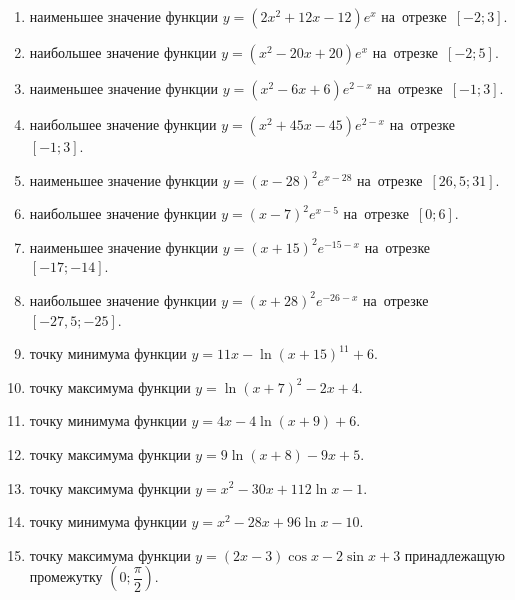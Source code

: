 \documentclass[a4paper,10pt]{article}
\begin{document}
\begin{enumerate}
\item {} наименьшее значение функции $y=\left(2x^2 +12x -12\right)e^{x }$ на~отрезке~$\left[-2;3\right]$.

\item {} наибольшее значение функции $y=\left(x^2 -20x +20\right)e^{x}$ на~отрезке~$\left[-2;5\right]$.

\item {} наименьшее значение функции $y=\left(x^2 -6x +6\right)e^{2-x}$ на~отрезке~$\left[-1;3\right]$.

\item {} наибольшее значение функции $y=\left(x^2 +45x -45\right)e^{2-x}$ на~отрезке~$\left[-1;3\right]$.

\item {} наименьшее значение функции $y=\left(x-28\right)^2e^{x-28}$ на~отрезке~$\left[26,5;31\right]$.

\item {} наибольшее значение функции $y=\left(x-7\right)^2e^{x-5}$ на~отрезке~$\left[0;6\right]$.

\item {} наименьшее значение функции $y=\left(x+15\right)^2e^{-15-x}$ на~отрезке~$\left[-17;-14\right]$.

\item {} наибольшее значение функции $y=\left(x+28\right)^2e^{-26-x}$ на~отрезке~$\left[-27,5;-25\right]$.

\item {} точку минимума функции $y=11x-\ln\left(x+15\right)^{11}+6$.

\item {} точку максимума функции $y=\ln\left(x+7\right)^{2}-2x+4$.

\item {} точку минимума функции $y=4x-4\ln\left(x+9\right)+6$.

\item {} точку максимума функции $y=9\ln\left(x+8\right)-9x+5$.

\item {} точку максимума функции $y=x^2-30x+112\ln x -1$.

\item {} точку минимума функции $y=x^2-28x+96\ln x -10$.

\item {} точку максимума функции $y=\left(2x-3\right)\cos x -2\sin x+3$
принадлежащую промежутку $\left(0;\dfrac{\pi}{2}\right)$.


\end{enumerate}
\end{document}
